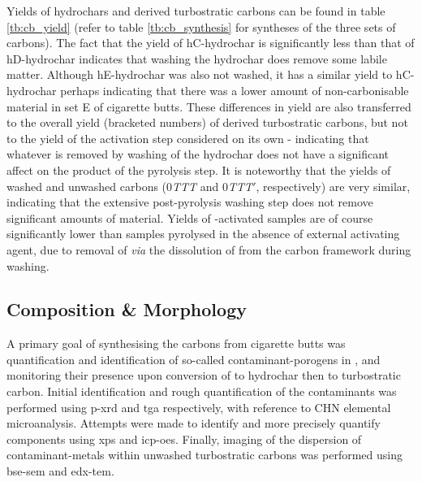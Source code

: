 Yields of \glspl{hydrochar} and derived \glspl{turbostratic carbon} can be found in table \ref{tb:cb_yield} (refer to table \ref{tb:cb_synthesis} for syntheses of the three sets of carbons). The fact that the yield of hC-hydrochar is significantly less than that of hD-hydrochar indicates that washing the \gls{hydrochar} does remove some labile matter. Although hE-hydrochar was also not washed, it has a similar yield to hC-hydrochar perhaps indicating that there was a lower amount of non-carbonisable material in set E of cigarette butts. These differences in yield are also transferred to the overall yield (bracketed numbers) of derived \glspl{turbostratic carbon}, but not to the yield of the activation step considered on its own - indicating that whatever is removed by washing of the \gls{hydrochar} does not have a significant affect on the product of the pyrolysis step. It is noteworthy that the yields of washed and unwashed carbons (0\textit{TTT} and 0\textit{TTT}$'$, respectively) are very similar, indicating that the extensive post-pyrolysis washing step does not remove significant amounts of material. Yields of -activated samples are of course significantly lower than samples pyrolysed in the absence of external \gls{activating agent}, due to removal of  \textit{via} the dissolution of  from the carbon framework during washing.


\subsection{Composition \& Morphology}

A primary goal of synthesising the carbons from cigarette butts was quantification and identification of so-called contaminant-\glspl{porogen} in , and monitoring their presence upon conversion of  to \gls{hydrochar} then to \gls{turbostratic carbon}. Initial identification and rough quantification of the contaminants was performed using \acrshort{p-xrd} and \acrshort{tga} respectively, with reference to CHN elemental microanalysis. Attempts were made to identify and more precisely quantify components using \acrshort{xps} and \acrshort{icp-oes}. Finally, imaging of the dispersion of contaminant-metals within unwashed \glspl{turbostratic carbon} was performed using \acrshort{bse}-\acrshort{sem} and \acrshort{edx}-\acrshort{tem}.

